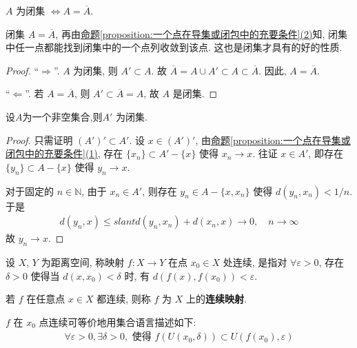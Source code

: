 \documentclass[../../main.tex]{subfiles}
\begin{document}
\begin{theorem}
$A$ 为闭集 $\Leftrightarrow A = \overline{A}$.
\end{theorem}
\begin{remark}
闭集 $A = \overline{A}$, 再由\hyperref[proposition:一个点在导集或闭包中的充要条件]{命题\ref{proposition:一个点在导集或闭包中的充要条件}(2)}知, 闭集中任一点都能找到闭集中的一个点列收敛到该点. 这也是闭集才具有的好的性质.
\end{remark}
\begin{proof}
“$\Rightarrow$”. $A$ 为闭集, 则 $A' \subset A$. 故 $\overline{A} = A \cup A' \subset A \subset \overline{A}$. 因此, $A = \overline{A}$.

“$\Leftarrow$”. 若 $A = \overline{A}$, 则 $A' \subset \overline{A} = A$, 故 $A$ 是闭集.
\end{proof}

\begin{theorem}
设$A$为一个非空集合,则$A'$ 为闭集.
\end{theorem}
\begin{proof}
只需证明 $(A')' \subset A'$. 设 $x \in (A')'$, 由\hyperref[proposition:一个点在导集或闭包中的充要条件]{命题\ref{proposition:一个点在导集或闭包中的充要条件}(1)}, 存在 $\{x_n\} \subset A' - \{x\}$ 使得 $x_n \to x$. 往证 $x \in A'$, 即存在 $\{y_n\} \subset A - \{x\}$ 使得 $y_n \to x$.

对于固定的 $n \in \mathbb{N}$, 由于 $x_n \in A'$, 则存在 $y_n \in A - \{x, x_n\}$ 使得 $d(y_n, x_n) < 1/n$. 于是
\begin{align*}
d(y_n, x) \leqslant slant d(y_n, x_n) + d(x_n, x) \to 0, \quad n \to \infty
\end{align*}
故 $y_n \to x$.
\end{proof}

\begin{definition}[连续映射]
设 $X$, $Y$ 为距离空间, 称映射 $f : X \to Y$ 在点 $x_0 \in X$ 处连续, 是指对 $\forall \varepsilon > 0$, 存在 $\delta > 0$ 使得当 $d(x, x_0) < \delta$ 时, 有 $d(f(x), f(x_0)) < \varepsilon$.

若 $f$ 在任意点 $x \in X$ 都连续, 则称 $f$ 为 $X$ 上的\textbf{连续映射}.
\end{definition}
\begin{remark}
$f$ 在 $x_0$ 点连续可等价地用集合语言描述如下:
\begin{align*}
\forall \varepsilon > 0, \exists \delta > 0, \text{ 使得 } f(U(x_0, \delta)) \subset U(f(x_0), \varepsilon)
\end{align*}
\end{remark}
\end{document}
